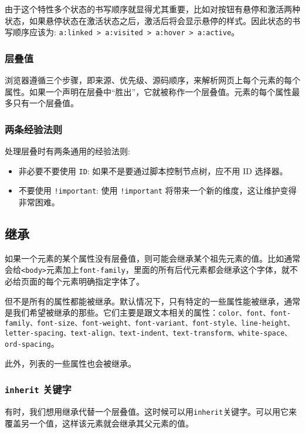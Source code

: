 由于这个特性多个状态的书写顺序就显得尤其重要，比如对按钮有悬停和激活两种状态，如果悬停状态在激活状态之后，激活后将会显示悬停的样式。因此状态的书写顺序应该为: \texttt{a:linked > a:visited > a:hover > a:active}。

\subsubsection*{层叠值}

浏览器遵循三个步骤，即来源、优先级、源码顺序，来解析网页上每个元素的每个属性。如果一个声明在层叠中“胜出”，它就被称作一个层叠值。元素的每个属性最多只有一个层叠值。

\subsubsection*{两条经验法则}

处理层叠时有两条通用的经验法则:
\begin{itemize}
    \item 非必要不要使用 \texttt{ID}: 如果不是要通过脚本控制节点树，应不用 ID 选择器。
    \item 不要使用 \texttt{!important}: 使用 \texttt{!important} 将带来一个新的维度，这让维护变得非常困难。
\end{itemize}

\subsection{继承}

如果一个元素的某个属性没有层叠值，则可能会继承某个祖先元素的值。比如通常会给\texttt{<body>}元素加上\texttt{font-family}，里面的所有后代元素都会继承这个字体，就不必给页面的每个元素明确指定字体了。

但不是所有的属性都能被继承。默认情况下，只有特定的一些属性能被继承，通常是我们希望被继承的那些。它们主要是跟文本相关的属性：\texttt{color、font、font-family、font-size、font-weight、font-variant、font-style、line-height、letter-spacing、text-align、text-indent、text-transform、white-space、ord-spacing}。

此外，列表的一些属性也会被继承。

\subsubsection*{\texttt{inherit} 关键字}

有时，我们想用继承代替一个层叠值。这时候可以用\texttt{inherit}关键字。可以用它来覆盖另一个值，这样该元素就会继承其父元素的值。

